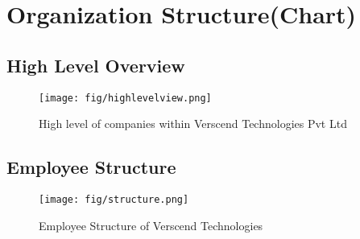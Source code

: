 \section{Organization Structure(Chart)}
\subsection{High Level Overview}
\begin{figure}[h!]
\centering
\texttt{[image: fig/highlevelview.png]}
\caption{High level of companies within Verscend Technologies Pvt Ltd}
\end{figure}
\cleardoublepage
\subsection{Employee Structure}
\begin{figure}[h!]
\centering
\texttt{[image: fig/structure.png]}
\caption{Employee Structure of Verscend Technologies}
\end{figure}
\cleardoublepage
